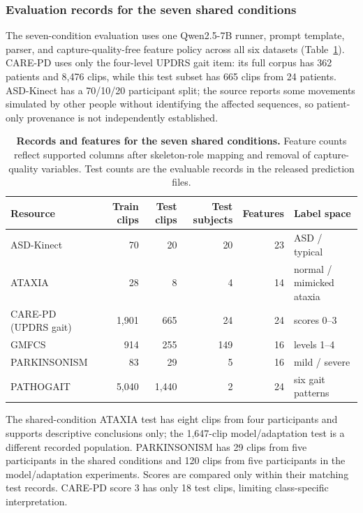 \subsubsection{Evaluation records for the seven shared conditions}

The seven-condition evaluation uses one Qwen2.5-7B runner, prompt template, parser, and capture-quality-free feature policy across all six datasets (Table~\ref{tab:standardized_contract}). CARE-PD uses only the four-level UPDRS gait item: its full corpus has 362 patients and 8,476 clips, while this test subset has 665 clips from 24 patients. ASD-Kinect has a 70/10/20 participant split; the source reports some movements simulated by other people without identifying the affected sequences, so patient-only provenance is not independently established.

\begin{table}[H]
\centering
\caption{\textbf{Records and features for the seven shared conditions.} Feature counts reflect supported columns after skeleton-role mapping and removal of capture-quality variables. Test counts are the evaluable records in the released prediction files.}
\label{tab:standardized_contract}
\small
\setlength{\tabcolsep}{4pt}
\begin{tabular}{lrrrrl}
\toprule
Resource & Train clips & Test clips & Test subjects & Features & Label space \\
\midrule
ASD-Kinect & 70 & 20 & 20 & 23 & ASD / typical \\
ATAXIA & 28 & 8 & 4 & 14 & normal / mimicked ataxia \\
CARE-PD (UPDRS gait) & 1,901 & 665 & 24 & 24 & scores 0--3 \\
GMFCS & 914 & 255 & 149 & 16 & levels 1--4 \\
PARKINSONISM & 83 & 29 & 5 & 16 & mild / severe \\
PATHOGAIT & 5,040 & 1,440 & 2 & 24 & six gait patterns \\
\bottomrule
\end{tabular}
\end{table}

The shared-condition ATAXIA test has eight clips from four participants and supports descriptive conclusions only; the 1,647-clip model/adaptation test is a different recorded population. PARKINSONISM has 29 clips from five participants in the shared conditions and 120 clips from five participants in the model/adaptation experiments. Scores are compared only within their matching test records. CARE-PD score 3 has only 18 test clips, limiting class-specific interpretation.

